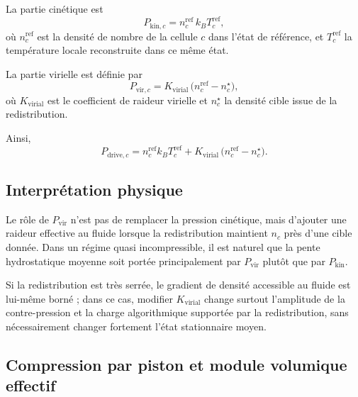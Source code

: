 \documentclass[11pt,a4paper]{article}
\begin{document}
La partie cinétique est
\begin{equation}
 P_{\mathrm{kin},c} = n_c^{\mathrm{ref}}\,k_B T_c^{\mathrm{ref}},
\end{equation}
où $n_c^{\mathrm{ref}}$ est la densité de nombre de la cellule $c$ dans l'état de référence, et $T_c^{\mathrm{ref}}$ la température locale reconstruite dans ce même état.

La partie virielle est définie par
\begin{equation}
 P_{\mathrm{vir},c} = K_{\mathrm{virial}}\,\bigl(n_c^{\mathrm{ref}} - n_c^{\star}\bigr),
\end{equation}
où $K_{\mathrm{virial}}$ est le coefficient de raideur virielle et $n_c^{\star}$ la densité cible issue de la redistribution.

Ainsi,
\begin{equation}
 P_{\mathrm{drive},c} = n_c^{\mathrm{ref}} k_B T_c^{\mathrm{ref}} + K_{\mathrm{virial}}\,\bigl(n_c^{\mathrm{ref}} - n_c^{\star}\bigr).
\end{equation}

\subsection{Interprétation physique}

Le rôle de $P_{\mathrm{vir}}$ n'est pas de remplacer la pression cinétique, mais d'ajouter une raideur effective au fluide lorsque la redistribution maintient $n_c$ près d'une cible donnée. Dans un régime quasi incompressible, il est naturel que la pente hydrostatique moyenne soit portée principalement par $P_{\mathrm{vir}}$ plutôt que par $P_{\mathrm{kin}}$.

Si la redistribution est très serrée, le gradient de densité accessible au fluide est lui-même borné ; dans ce cas, modifier $K_{\mathrm{virial}}$ change surtout l'amplitude de la contre-pression et la charge algorithmique supportée par la redistribution, sans nécessairement changer fortement l'état stationnaire moyen.


\subsection{Compression par piston et module volumique effectif}
\end{document}

